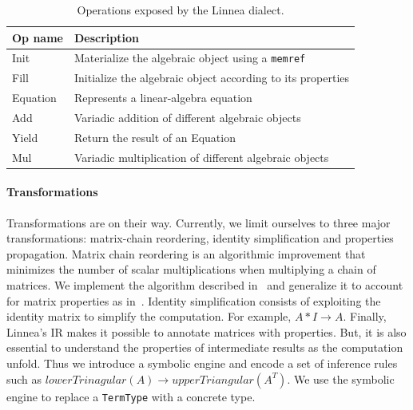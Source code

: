 \documentclass[conference]{IEEEtran}
\begin{document}
\begin{table}
\begin{center}
\begin{tabular}{ll}
    \toprule
    \footnotesize{Op name}     & \footnotesize{Description} \\ \midrule
    \footnotesize{Init} & \footnotesize{Materialize the algebraic object using a \texttt{memref}} \\
    \rowcolor{aluminium1}
    \footnotesize{Fill} & \footnotesize{Initialize the algebraic object according to its properties}  \\
    \rowcolor{aluminium1}
    \footnotesize{Equation} & \footnotesize{Represents a linear-algebra equation} \\
    \footnotesize{Add} & \footnotesize{Variadic addition of different algebraic objects} \\
    \rowcolor{aluminium1}
    \footnotesize{Yield} & \footnotesize{Return the result of an Equation} \\
    \footnotesize{Mul} & \footnotesize{Variadic multiplication of different algebraic objects} \\ \bottomrule
\end{tabular}
\end{center}
\caption{Operations exposed by the Linnea dialect.}
\label{table:operations}
\end{table} 

\paragraph{Transformations}

Transformations are on their way. Currently, we limit ourselves to three major
transformations: matrix-chain reordering, identity simplification and
properties propagation. Matrix chain reordering is an algorithmic improvement
that minimizes the number of scalar multiplications when multiplying a chain of
matrices. We implement the algorithm described in~\cite{cormen2009introduction}
and generalize it to account for matrix properties as
in~\cite{barthels2020automatic}. Identity simplification consists of exploiting
the identity matrix to simplify the computation. For example, $A * I
\rightarrow A$.  Finally, Linnea's IR makes it possible to annotate matrices
with properties. But, it is also essential to understand the properties of
intermediate results as the computation unfold. Thus we introduce a symbolic
engine and encode a set of inference rules such as $lowerTrinagular(A)
\rightarrow upperTriangular(A^T)$. We use the symbolic engine to replace a
\texttt{TermType} with a concrete type.
\end{document}
